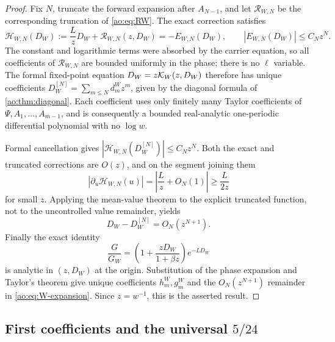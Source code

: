 \begin{proof}
Fix $N$, truncate the forward expansion after $A_{N-1}$, and let
$\mathcal R_{W,N}$ be the corresponding truncation of
\eqref{ao:eq:RW}.  The exact correction satisfies
\[
 \mathcal H_{W,N}(D_W):=\frac LzD_W+\mathcal R_{W,N}(z,D_W)
 =-E_{W,N}(D_W),
 \qquad |E_{W,N}(D_W)|\le C_Nz^N.
\]
The constant and logarithmic terms were absorbed by the carrier equation, so
all coefficients of $\mathcal R_{W,N}$ are bounded uniformly in the phase;
there is no $\ell$ variable.  The formal fixed-point equation
$D_W=z\mathcal K_W(z,D_W)$ therefore has unique coefficients
$D_W^{[N]}=\sum_{m\le N}d_m^Wz^m$, given by the diagonal formula of
\cref{ao:thm:diagonal}.  Each coefficient uses only finitely many Taylor
coefficients of $\Psi,A_1,\ldots,A_{m-1}$, and is consequently a bounded
real-analytic one-periodic differential polynomial with no $\log w$.

Formal cancellation gives
$|\mathcal H_{W,N}(D_W^{[N]})|\le C_Nz^N$.  Both the exact and truncated
corrections are $O(z)$, and on the segment joining them
\[
 |\partial_u\mathcal H_{W,N}(u)|
 =\left|\frac Lz+O_N(1)\right|\ge\frac{L}{2z}
\]
for small $z$.  Applying the mean-value theorem to the explicit truncated
function, not to the uncontrolled value remainder, yields
\[
 D_W-D_W^{[N]}=O_N(z^{N+1}).
\]
Finally the exact identity
\[
 \frac G{G_W}
 =\left(1+\frac{zD_W}{1+\beta z}\right)e^{-LD_W}
\]
is analytic in $(z,D_W)$ at the origin.  Substitution of the phase expansion
and Taylor's theorem give unique coefficients $h_m^W,g_m^W$ and the
$O_N(z^{N+1})$ remainder in \eqref{ao:eq:W-expansion}.  Since
$z=w^{-1}$, this is the asserted result.
\end{proof}

\subsection{First coefficients and the universal
\texorpdfstring{$5/24$}{5/24}}

